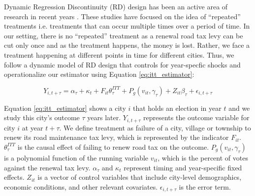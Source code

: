 Dynamic Regression Discontinuity (RD) design has been an active area of research in recent years \citep{hsu2024dynamic, biasi_what_2025, ruggieri_drd_2025}. These studies have focused on the idea of ``repeated'' treatments i.e. treatments that can occur multiple times over a period of time. In our setting, there is no ``repeated'' treatment as a renewal road tax levy can be cut only once and as the treatment happens, the money is lost.  
Rather, we face a treatment happening at different points in time for different cities. Thus, we follow a dynamic model of RD design that controls for year-specfic shocks and operationalize our estimator using Equation \ref{eq:itt_estimator}:


  
\begin{equation}
Y_{i,t+\tau} = \alpha_\tau + \kappa_t + F_{it} \theta_{\tau}^{ITT} + P_g (v_{it}, \gamma_\tau) + Z_{it} \beta_\tau + \epsilon_{i,t + \tau}
\label{eq:itt_estimator}
\end{equation}

\noindent Equation \ref{eq:itt_estimator} shows a city $i$ that holds an election in year $t$ and we study this city's outcome $\tau$ years later. $Y_{i,t+\tau}$ represents the outcome variable for city $i$ at year $t + \tau$. We define treatment as failure of a city, village or township to renew its road maintenance tax levy, which is represented by the indicator $F_{it}$. $\theta_{\tau}^{ITT}$ is the causal effect of failing to renew road tax on the outcome. $P_g (v_{it}, \gamma_\tau)$ is a polynomial function of the running variable $v_{it}$, which is the percent of votes against the renewal tax levy. $\alpha_\tau$ and $\kappa_t$ represent timing and year-specific fixed effects. $Z_{it}$ is a vector of control variables that include city-level demographics, economic conditions, and other relevant covariates. $\epsilon_{i,t + \tau}$ is the error term.

